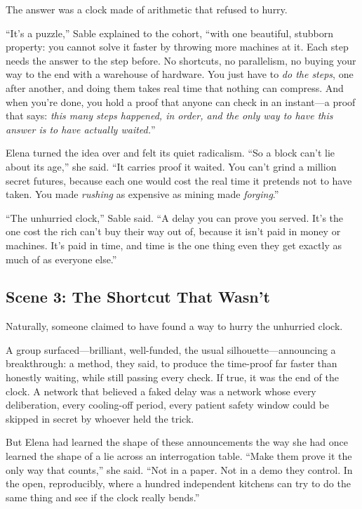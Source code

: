 The answer was a clock made of arithmetic that refused to hurry.

``It's a puzzle,'' Sable explained to the cohort, ``with one beautiful, stubborn
property: you cannot solve it faster by throwing more machines at it. Each step
needs the answer to the step before. No shortcuts, no parallelism, no buying your
way to the end with a warehouse of hardware. You just have to \emph{do the steps},
one after another, and doing them takes real time that nothing can compress. And
when you're done, you hold a proof that anyone can check in an instant---a proof
that says: \emph{this many steps happened, in order, and the only way to have this
answer is to have actually waited.}''

Elena turned the idea over and felt its quiet radicalism. ``So a block can't lie
about its age,'' she said. ``It carries proof it waited. You can't grind a million
secret futures, because each one would cost the real time it pretends not to have
taken. You made \emph{rushing} as expensive as mining made \emph{forging}.''

``The unhurried clock,'' Sable said. ``A delay you can prove you served. It's the
one cost the rich can't buy their way out of, because it isn't paid in money or
machines. It's paid in time, and time is the one thing even they get exactly as much
of as everyone else.''

\hypertarget{scene-3-the-shortcut-that-wasnt}{%
\subsection{Scene 3: The Shortcut That
Wasn't}\label{scene-3-the-shortcut-that-wasnt}}

Naturally, someone claimed to have found a way to hurry the unhurried clock.

A group surfaced---brilliant, well-funded, the usual silhouette---announcing a
breakthrough: a method, they said, to produce the time-proof far faster than
honestly waiting, while still passing every check. If true, it was the end of the
clock. A network that believed a faked delay was a network whose every
deliberation, every cooling-off period, every patient safety window could be
skipped in secret by whoever held the trick.

But Elena had learned the shape of these announcements the way she had once learned
the shape of a lie across an interrogation table. ``Make them prove it the only way
that counts,'' she said. ``Not in a paper. Not in a demo they control. In the open,
reproducibly, where a hundred independent kitchens can try to do the same thing and
see if the clock really bends.''

